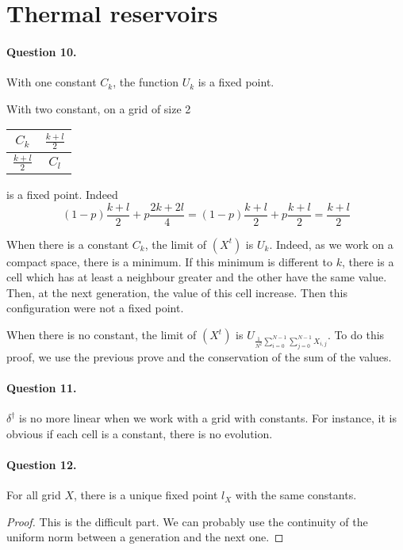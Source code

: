 \section{Thermal reservoirs}

\paragraph{Question 10.}

With one constant $C_k$, the function $U_k$ is a fixed point.

With two constant, on a grid of size 2

\begin{tabular}{|c|c|}
\hline
$C_k$ & $\frac{k+l}{2}$\\
\hline
$\frac{k+l}{2}$ & $C_l$\\
\hline
\end{tabular}

is a fixed point. Indeed 
$$
    (1-p)\frac{k+l}{2} + p\frac{2k+2l}{4}=(1-p)\frac{k+l}{2} + p\frac{k+l}{2} = \frac{k+l}{2}
$$

When there is a constant $C_k$, the limit of $(X^t)$ is $U_k$. Indeed, as we work on a compact space, there is a minimum. If this minimum is different to $k$, there is a cell which has at least a neighbour greater and the other have the same value. Then, at the next generation, the value of this cell increase. Then this configuration were not a fixed point.

When there is no constant, the limit of $(X^t)$ is $U_{\frac{1}{N^2}\sum\limits_{i=0}^{N-1} \sum\limits_{j=0}^{N-1} X_{i,j}}$. To do this proof, we use the previous prove and the conservation of the sum of the values.

\paragraph{Question 11.}

$\delta^\dagger$ is no more linear when we work with a grid with constants. For instance, it is obvious if each cell is a constant, there is no evolution.

\paragraph{Question 12.}

\begin{lemma}
    For all grid $X$, there is a unique fixed point $l_X$ with the same constants.
\end{lemma}
\begin{proof}
    This is the difficult part. We can probably use the continuity of the uniform norm between a generation and the next one.
\end{proof}

